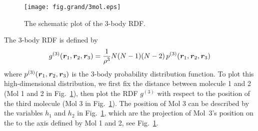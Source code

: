 \documentclass[aip,jcp,a4paper,reprint,onecolumn]{revtex4-1}
\newcommand{\vect}[1]{\textbf{\textit{#1}}}
\begin{document}
\begin{figure}
  \centering
  \texttt{[image: fig.grand/3mol.eps]}
  \caption{The schematic plot of the 3-body RDF.}\label{fig:tmp3}
\end{figure}



The 3-body RDF is defined by
\begin{align}
  g^{(3)}(\vect r_1, \vect r_2, \vect r_3) =
  \frac{1}{\rho^3}N(N-1)(N-2) \,p^{(3)}(\vect r_1, \vect r_2, \vect r_3) 
\end{align}
where $p^{(3)}(\vect r_1, \vect r_2, \vect r_3) $ is the 3-body
probability distribution function. To plot this high-dimensional
distribution, we first fix the distance between molecule 1 and 2 (Mol
1 and 2 in Fig.~\ref{fig:tmp3}), then plot the RDF $g^{(3)}$ with
respect to the position of the third molecule (Mol 3 in
Fig.~\ref{fig:tmp3}).  The position of Mol 3 can be described by
the variables $h_1$ and $h_2$ in Fig.~\ref{fig:tmp3}, which are
the projection of Mol~3's position on the to the
axis defined by Mol 1 and 2, see Fig.~\ref{fig:tmp3}.
\end{document}
